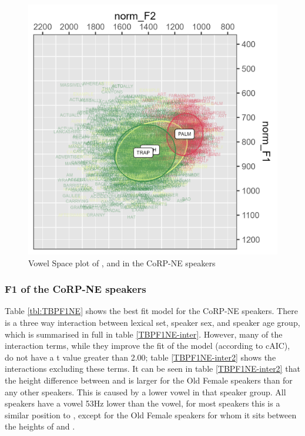 \documentclass[../../00.FullDoc/tex/Thesis]{subfiles}
\begin{document}
\begin{figure}[h]
	\includegraphics[width=\textwidth]{../figures/TBP-NE-vplot.png}
	\caption{Vowel Space plot of \trap{},\bath{} and \palm{} in the CoRP-NE speakers} \label{fig:TBPvplotNE}
\end{figure}



\subsubsection{F1 of the CoRP-NE speakers}
Table \ref{tbl:TBPF1NE} shows the best fit model for the CoRP-NE speakers. There is a three way interaction between lexical set, speaker sex, and speaker age group, which is summarised in full in table \ref{TBPF1NE-inter}. However, many of the interaction terms, while they improve the fit of the model (according to cAIC), do not have a t value greater than 2.00; table \ref{TBPF1NE-inter2} shows the interactions excluding these terms. It can be seen in table \ref{TBPF1NE-inter2} that the height difference between \trap{} and \palm{} is larger for the Old Female speakers than for any other speakers. This is caused by a lower \trap{} vowel in that speaker group. All speakers have a \bath{} vowel 53Hz lower than the \palm{} vowel, for most speakers this is a similar position to \trap{}, except for the Old Female speakers for whom it sits between the heights of \trap{} and \palm{}.
\end{document}
